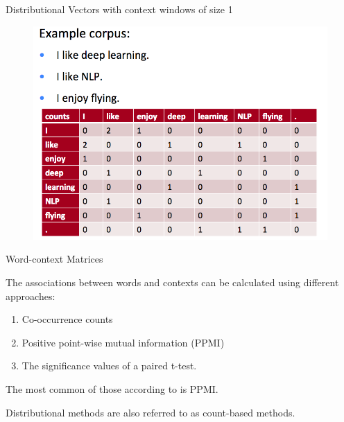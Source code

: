 \begin{frame}{Distributional Vectors with context windows of size 1}


\begin{figure}[htb]
	\centering
	 \includegraphics[scale=0.3]{pics/distributionalSocher.png}
\end{figure}



\end{frame}



\begin{frame}{Word-context Matrices}
\begin{scriptsize}
The associations between words and contexts can be calculated using different approaches:
\begin{enumerate}
 \item Co-occurrence counts
\item Positive point-wise mutual information (PPMI)
\item The significance values of a paired t-test.  
\end{enumerate}

The most common of those according to \cite{JurafskyBook} is PPMI.

Distributional methods are also referred to as count-based methods.

\end{scriptsize}
\end{frame}



